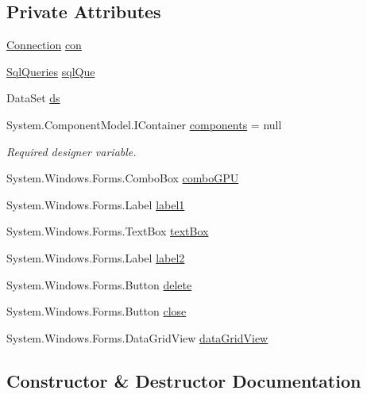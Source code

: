 \subsection*{Private Attributes}
\begin{DoxyCompactItemize}
\item 
\hyperlink{classproject__bot_1_1_connection}{Connection} \hyperlink{classproject__bot_1_1_delete_goods_a08a0e1f0ab0adf5e472cfa56fb8d2971}{con}
\item 
\hyperlink{classproject__bot_1_1_sql_queries}{Sql\+Queries} \hyperlink{classproject__bot_1_1_delete_goods_a7f408af712d074d734e0002521e7ae7c}{sql\+Que}
\item 
Data\+Set \hyperlink{classproject__bot_1_1_delete_goods_a8360985013a4433153c4314fa92d3ee9}{ds}
\item 
System.\+Component\+Model.\+I\+Container \hyperlink{classproject__bot_1_1_delete_goods_a3d98e9b80b55a3625321cfc2e4880409}{components} = null
\begin{DoxyCompactList}\small\item\em Required designer variable. \end{DoxyCompactList}\item 
System.\+Windows.\+Forms.\+Combo\+Box \hyperlink{classproject__bot_1_1_delete_goods_acb227ba4a1ec1c8a72742e3eec5fc3b1}{combo\+G\+PU}
\item 
System.\+Windows.\+Forms.\+Label \hyperlink{classproject__bot_1_1_delete_goods_a6ecb8a7ec1f3054ecdf4d6eed9e5d1b5}{label1}
\item 
System.\+Windows.\+Forms.\+Text\+Box \hyperlink{classproject__bot_1_1_delete_goods_a9cf822202f4afabd346e6d5c258b9ca1}{text\+Box}
\item 
System.\+Windows.\+Forms.\+Label \hyperlink{classproject__bot_1_1_delete_goods_a1e01ec72a26f957424fc915f3b7a41c9}{label2}
\item 
System.\+Windows.\+Forms.\+Button \hyperlink{classproject__bot_1_1_delete_goods_a4e4a9dd8ec62ba939df17afa0eb99448}{delete}
\item 
System.\+Windows.\+Forms.\+Button \hyperlink{classproject__bot_1_1_delete_goods_ad5c2713af495340b59f923cd20340ffc}{close}
\item 
System.\+Windows.\+Forms.\+Data\+Grid\+View \hyperlink{classproject__bot_1_1_delete_goods_abe245fdce3a4e5551114f7b5bb7b4f3b}{data\+Grid\+View}
\end{DoxyCompactItemize}


\subsection{Constructor \& Destructor Documentation}
\mbox{\label{classproject__bot_1_1_delete_goods_aa54c37fcade489d8a3814b99d644bdc3}} 
